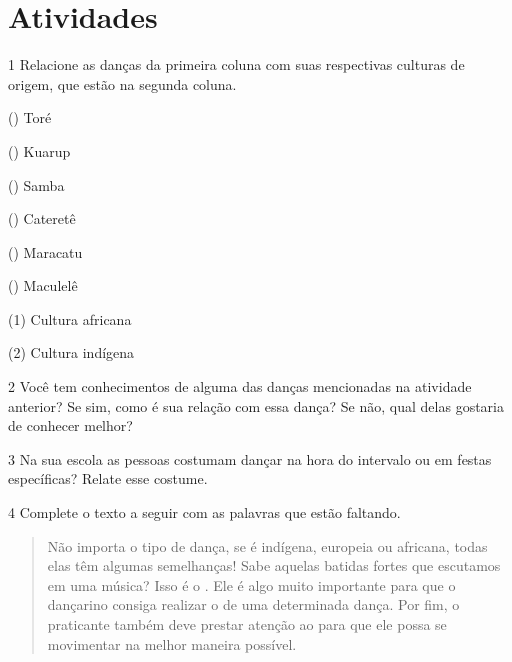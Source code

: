 \section*{Atividades}

\num{1} Relacione as danças da primeira coluna com suas respectivas culturas de
  origem, que estão na segunda coluna.

\begin{multicols}{2}
() Toré

() Kuarup

() Samba

() Cateretê

() Maracatu

() Maculelê

\columnbreak

(1) Cultura africana\medskip

(2) Cultura indígena
\end{multicols}


\num{2} Você tem conhecimentos de alguma das danças mencionadas na atividade anterior? Se sim, como é sua relação com essa dança? Se não, qual delas gostaria de conhecer melhor?


\num{3} Na sua escola as pessoas costumam dançar na hora do intervalo ou em festas específicas? Relate esse costume.


\num{4} Complete o texto a seguir com as palavras que estão faltando.

\begin{quote}
Não importa o tipo de dança, se é indígena, europeia ou africana, todas
elas têm algumas semelhanças!
Sabe aquelas batidas fortes que escutamos em uma música? Isso é o .
Ele é algo muito importante para que o dançarino consiga realizar o  de
uma determinada dança. Por fim, o praticante também deve prestar atenção ao
 para que ele possa se movimentar na melhor maneira possível.
\end{quote}


